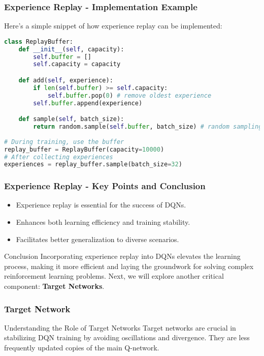 \documentclass[aspectratio=169]{beamer}
\begin{document}
\begin{frame}[fragile]
    \frametitle{Experience Replay - Implementation Example}
    Here’s a simple snippet of how experience replay can be implemented:
    \begin{lstlisting}[language=Python]
class ReplayBuffer:
    def __init__(self, capacity):
        self.buffer = []
        self.capacity = capacity

    def add(self, experience):
        if len(self.buffer) >= self.capacity:
            self.buffer.pop(0) # remove oldest experience
        self.buffer.append(experience)

    def sample(self, batch_size):
        return random.sample(self.buffer, batch_size) # random sampling
    
# During training, use the buffer
replay_buffer = ReplayBuffer(capacity=10000)
# After collecting experiences
experiences = replay_buffer.sample(batch_size=32)
    \end{lstlisting}
\end{frame}

\begin{frame}[fragile]
    \frametitle{Experience Replay - Key Points and Conclusion}
    \begin{itemize}
        \item Experience replay is essential for the success of DQNs.
        \item Enhances both learning efficiency and training stability.
        \item Facilitates better generalization to diverse scenarios.
    \end{itemize}
    \begin{block}{Conclusion}
        Incorporating experience replay into DQNs elevates the learning process, making it more efficient and laying the groundwork for solving complex reinforcement learning problems. Next, we will explore another critical component: \textbf{Target Networks}.
    \end{block}
\end{frame}

\begin{frame}[fragile]
    \frametitle{Target Network}
    \begin{block}{Understanding the Role of Target Networks}
        Target networks are crucial in stabilizing DQN training by avoiding oscillations and divergence. They are less frequently updated copies of the main Q-network.
    \end{block}
\end{frame}
\end{document}
